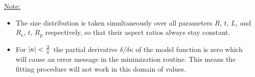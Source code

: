 \vspace{5mm}

\uline{Note:}
\begin{itemize}
\item The size distribution is taken simultaneously over all parameters $R$, $t$, $L$, and $R_\mathrm{e}$, $t$, $R_\mathrm{p}$ respectively, so that their aspect ratios always stay constant.
\item For ${\left\vert\kappa\right\vert}<\frac{2}{\pi}$ the partial derivative $\delta /\delta\kappa$ of the model function is zero which will cause an error message in the minimization routine. This means the fitting procedure will not work in this domain of values.
\end{itemize}
